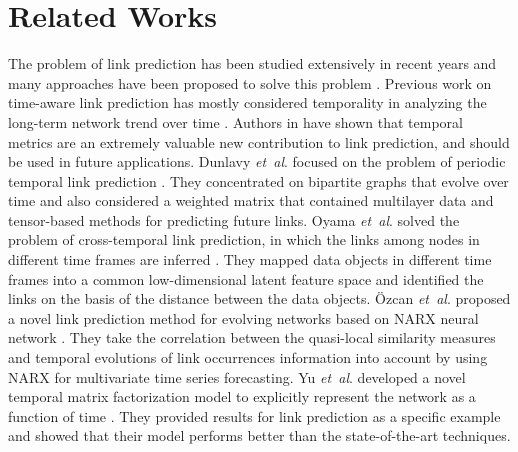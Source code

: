 \section{Related Works}\label{sec:related}
\newcommand{\etal}{\textit{et~al}.}

The problem of link prediction has been studied extensively in recent years and many approaches have been proposed to solve this problem \cite{wang2015link,wang2014review}.
Previous work on time-aware link prediction has mostly considered temporality in analyzing the long-term network trend over time \cite{dhote2013survey}. Authors in \cite{potgieter2009temporality} have shown that temporal metrics are an extremely valuable new contribution to link prediction, and should be used in future applications. 
Dunlavy \etal{} focused on the problem of periodic temporal link prediction \cite{dunlavy2011temporal}. They concentrated on bipartite graphs that evolve over time and also considered a weighted matrix that contained multilayer data and tensor-based methods for predicting future links.
Oyama \etal{} solved the problem of cross-temporal link prediction, in which the links among nodes in different time frames are inferred \cite{oyama2011cross}. They mapped data objects in different time frames into a common low-dimensional latent feature space and identified the links on the basis of the distance between the data objects.
{\"O}zcan \etal{} proposed a novel link prediction method for evolving networks based on NARX neural network \cite{ozcan2016temporal}. They take the correlation between the quasi-local similarity measures and temporal evolutions of link occurrences information into account by using NARX for multivariate time series forecasting.
Yu \etal{} developed a novel temporal matrix factorization model to explicitly represent the network as a function of time \cite{yu2017temporally}. They provided results for link prediction as a specific example and showed that their model performs better than the state-of-the-art techniques.

